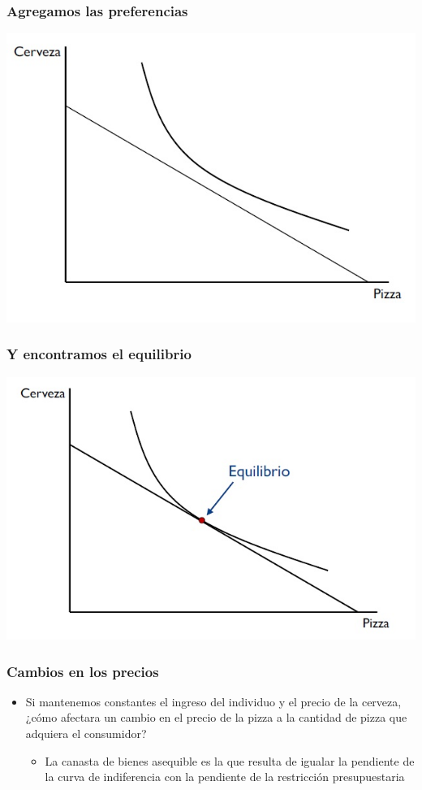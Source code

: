 \documentclass{beamer}
\begin{document}
\begin{frame}
\frametitle{ Agregamos las preferencias}
\centering
\includegraphics[scale=0.6]{Figures/Tema_02.18_rp16.jpg}
\end{frame}

\begin{frame}
\frametitle{ Y encontramos el equilibrio}
\centering
\includegraphics[scale=0.6]{Figures/Tema_02.19_rp17.jpg}
\end{frame}

\begin{frame}
\frametitle{ Cambios en los precios}
\begin{itemize}
    \item Si mantenemos constantes el ingreso del individuo y el precio de la cerveza, ¿cómo afectara un cambio en el precio de la pizza a la cantidad de pizza que adquiera el consumidor? \vspace{2mm}
    \begin{itemize}
         \item La canasta de bienes asequible es la que resulta de igualar la pendiente de la curva de indiferencia con la pendiente de la restricción presupuestaria 
    \end{itemize}
\end{itemize}
\end{frame}
\end{document}
